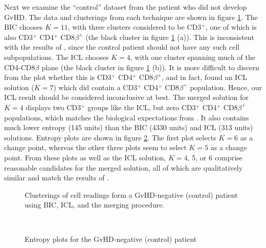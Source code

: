 \documentclass{uwstat572}
\renewcommand\;{\,}
\begin{document}
Next we examine the ``control'' dataset from the patient who did not develop GvHD.
The data and clusterings from each technique are shown in figure \ref{control}.
The BIC chooses $K = 11$, with three clusters considered to be CD3$^+$, one of which is also CD3$^+$ CD4$^+$ CD8$\beta^+$ (the black cluster in figure \ref{control} (a)).
This is inconsistent with the results of \cite{Brinkman07}, since the control patient should not have any such cell subpopulations.
The ICL chooses $K = 4$, with one cluster spanning much of the CD4-CD8$\beta$ plane (the black cluster in figure \ref{control} (b)).
It is more difficult to discern from the plot whether this is CD3$^+$ CD4$^+$ CD8$\beta^+$, and in fact, \cite{Baudry10} found an ICL solution ($K = 7$) which did contain a CD3$^+$ CD4$^+$ CD8$\beta^+$ population.
Hence, our ICL result should be considered inconclusive at best.
The merged solution for $K = 4$ displays two CD3$^+$ groups like the ICL, but zero CD3$^+$ CD4$^+$ CD8$\beta^+$ populations, which matches the biological expectations from \cite{Brinkman07}.
It also contains much lower entropy (145 units) than the BIC (4330 units) and ICL (313 units) solutions.
Entropy plots are shown in figure \ref{Entropy5_2}.
The first plot selects $K = 6$ as a change point, whereas the other three plots seem to select $K = 5$ as a change point.
From these plots as well as the ICL solution, $K = 4$, 5, or 6 comprise reasonable candidates for the merged solution, all of which are qualitatively similar and match the results of \cite{Brinkman07}.

\begin{figure}
\begin{center}
\end{center}
\caption{Clusterings of cell readings form a GvHD-negative (control) patient using BIC, ICL, and the merging procedure.}
\label{positive}
\label{control}
\end{figure}

\begin{figure}
\begin{center}
\\
\end{center}
\caption{Entropy plots for the GvHD-negative (control) patient}
\label{Entropy5_2}
\end{figure}
\end{document}
